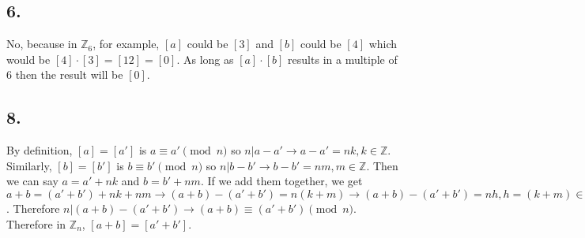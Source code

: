 \documentclass[12pt]{article}
\begin{document}
\begin{minipage}[t]{0.40\textwidth}
\end{minipage}
\hfill\vline\hfill
\begin{minipage}[t]{0.45\textwidth}
	
\subsection*{6.}
No, because in $ \mathbb{Z}_6 $, for example, $ [a] $ could be $ [3] $ and $ [b] $ could be $ [4] $ which would be $ [4]\cdot[3]=[12]=[0] $. As long as $ [a]\cdot[b] $ results in a multiple of $ 6 $ then the result will be $ [0] $.


\subsection*{8.} By definition, $ [a]=[a'] $ is $ a\equiv a'\pmod n $ so $ n|a-a' \rightarrow a-a'=nk, k\in\mathbb{Z}$. Similarly, $ [b]=[b'] $ is  $ b\equiv b'\pmod n $ so $ n|b-b' \rightarrow b-b'=nm, m\in\mathbb{Z}$. Then we can say $ a=a'+nk $ and $ b=b'+nm $. If we add them together, we get $ a+b=(a'+b')+nk+nm \rightarrow (a+b)-(a'+b')=n(k+m)\rightarrow (a+b)-(a'+b')=nh, h=(k+m)\in\mathbb{Z}$. Therefore $ n|(a+b)-(a'+b')\rightarrow (a+b)\equiv(a'+b')\pmod n $. Therefore in $ \mathbb{Z}_n $, $ [a+b]=[a'+b'] $.
	
	

\end{minipage}
\pagebreak

\end{document}
